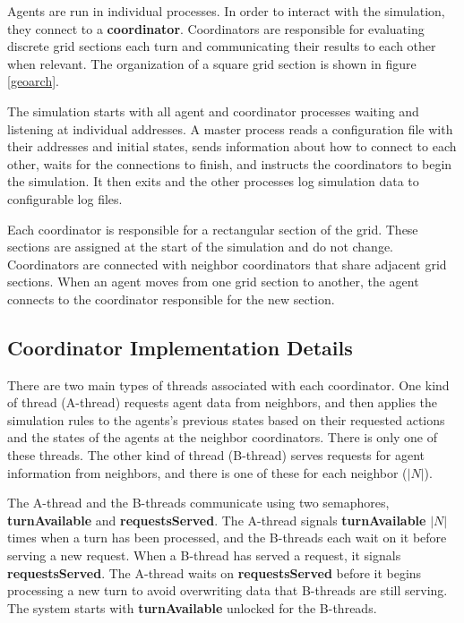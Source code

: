 Agents are run in individual processes. In order to interact with the simulation, they connect to a
\textbf{coordinator}. Coordinators are responsible for evaluating discrete grid sections each turn
and communicating their results to each other when relevant. The organization of a square grid
section is shown in figure \ref{geoarch}.

The simulation starts with all agent and coordinator processes waiting and listening at individual
addresses. A master process reads a configuration file with their addresses and initial states,
sends information about how to connect to each other, waits for the connections to finish, and
instructs the coordinators to begin the simulation. It then exits and the other processes log
simulation data to configurable log files.

Each coordinator is responsible for a rectangular section of the grid. These sections are assigned
at the start of the simulation and do not change. Coordinators are connected with neighbor
coordinators that share adjacent grid sections. When an agent moves from one grid section to
another, the agent connects to the coordinator responsible for the new section.

\subsection{Coordinator Implementation Details}

There are two main types of threads associated with each coordinator. One kind of thread (A-thread) requests agent data from neighbors, and then applies the simulation rules to the agents's previous states based on their requested actions and the states of the agents at the neighbor coordinators. There is only one of these threads. The other kind of thread (B-thread) serves requests for agent information from neighbors, and there is one of these for each neighbor ($|N|$).

The A-thread and the B-threads communicate using two semaphores, \textbf{turnAvailable} and \textbf{requestsServed}. The A-thread signals \textbf{turnAvailable} $|N|$ times when a turn has been processed, and the B-threads each wait on it before serving a new request. When a B-thread has served a request, it signals \textbf{requestsServed}. The A-thread waits on \textbf{requestsServed} before it begins processing a new turn to avoid overwriting data that B-threads are still serving. The system starts with \textbf{turnAvailable} unlocked for the B-threads.

